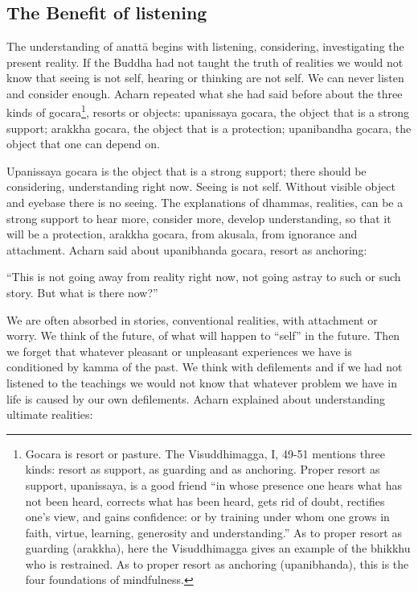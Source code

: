 \chapter[The Benefit of listening]{}
\section*{The Benefit of listening}


The understanding of anattā begins with listening, considering,
investigating the present reality. If the Buddha had not taught the
truth of realities we would not know that seeing is not self, hearing or
thinking are not self. We can never listen and consider enough. Acharn
repeated what she had said before about the three kinds of
gocara\footnote{Gocara is resort or
pasture. The Visuddhimagga, I, 49-51 mentions three kinds: resort as
support, as guarding and as anchoring. Proper resort as support,
upanissaya, is a good friend ``in whose presence one hears what has not
been heard, corrects what has been heard, gets rid of doubt, rectifies
one's view, and gains confidence: or by training under whom one grows in
faith, virtue, learning, generosity and understanding.'' As to proper
resort as guarding (arakkha), here the Visuddhimagga gives an example of
the bhikkhu who is restrained. As to proper resort as anchoring
(upanibhanda), this is the four foundations of mindfulness.}, resorts or
objects: upanissaya gocara, the object that is a strong support; arakkha
gocara, the object that is a protection; upanibandha gocara, the object
that one can depend on.

Upanissaya gocara is the object that is a strong support; there should
be considering, understanding right now. Seeing is not self. Without
visible object and eyebase there is no seeing. The explanations of
dhammas, realities, can be a strong support to hear more, consider more,
develop understanding, so that it will be a protection, arakkha gocara,
from akusala, from ignorance and attachment. Acharn said about
upanibhanda gocara, resort as anchoring:

``This is not going away from reality right now, not going astray to
such or such story. But what is there now?''

We are often absorbed in stories, conventional realities, with
attachment or worry. We think of the future, of what will happen to
``self'' in the future. Then we forget that whatever pleasant or
unpleasant experiences we have is conditioned by kamma of the past. We
think with defilements and if we had not listened to the teachings we
would not know that whatever problem we have in life is caused by our
own defilements. Acharn explained about understanding ultimate
realities:

